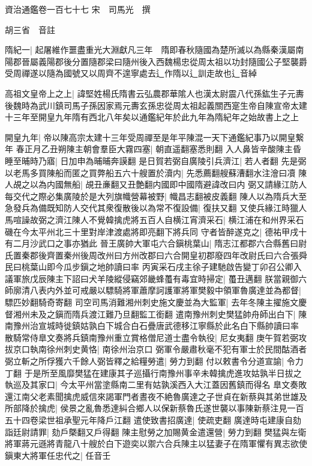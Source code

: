 資治通鑑卷一百七十七
宋　司馬光　撰

胡三省　音註

隋紀一|{
	起屠維作噩盡重光大淵獻凡三年　隋即春秋隨國為楚所滅以為縣秦漢屬南陽郡晉屬義陽郡後分置隨郡梁曰隨州後入西魏楊忠從周太祖以功封隨國公子堅襲爵受周禪遂以隨為國號又以周齊不遑寧處去辶作隋以辶訓走故也辶音綽}


高祖文皇帝上之上|{
	諱堅姓楊氏隋書云弘農郡華隂人也漢太尉震八代孫鈜生子元夀後魏時為武川鎮司馬子孫因家焉元夀玄孫忠從周太祖起義關西寔生帝自陳宣帝太建十三年至開皇九年隋有西北八年矣以通鑑紀年於此九年為隋紀年之始故書上之上}


開皇九年|{
	帝以陳高宗太建十三年受周禪至是年平陳混一天下通鑑紀事乃以開皇繋年}
春正月乙丑朔陳主朝會羣臣大霧四塞|{
	朝直遥翻塞悉則翻}
入人鼻皆辛酸陳主昏睡至晡時乃寤|{
	日加申為晡晡奔謨翻}
是日賀若弼自廣陵引兵濟江|{
	若人者翻}
先是弼以老馬多買陳船而匿之買弊船五六十艘置於瀆内|{
	先悉薦翻艘蘇漕翻水注澮曰凟}
陳人覘之以為内國無船|{
	覘丑亷翻又丑艶翻内國即中國隋避諱改曰内}
弼又請緣江防人每交代之際必集廣陵於是大列旗幟營幕被野|{
	幟昌志翻被皮義翻}
陳人以為隋兵大至急發兵為備既知防人交代其衆復散後以為常不復設備|{
	復扶又翻}
又使兵緣江時獵人馬喧譟故弼之濟江陳人不覺韓擒虎將五百人自横江宵濟采石|{
	横江浦在和州界采石磯在今太平州北三十里對岸津渡處將即亮翻下將兵同}
守者皆醉遂克之|{
	德祐甲戌十有二月沙武口之事亦猶此}
晉王廣帥大軍屯六合鎭桃葉山|{
	隋志江都郡六合縣舊曰尉氏置秦郡後齊置秦州後周改州曰方州改郡曰六合開皇初郡廢四年改尉氏曰六合張舜民曰桃葉山即今瓜步鎭之地帥讀曰率}
丙寅采石戌主徐子建馳啟告變丁卯召公卿入議軍旅戊辰陳主下詔曰犬羊陵縱侵竊郊畿蜂蠆有毒宜時掃定|{
	蠆丑邁翻}
朕當親御六師廓清八表内外並可戒嚴以驃騎將軍蕭摩訶護軍將軍樊毅中領軍魯廣達並為都督|{
	驃匹妙翻騎奇寄翻}
司空司馬消難湘州刺史施文慶並為大監軍|{
	去年冬陳主擢施文慶督湘州未及之鎭而隋兵渡江難乃旦翻監工銜翻}
遣南豫州刺史樊猛帥舟師出白下|{
	陳南豫州治宣城時徙鎮姑孰白下城合白石疊唐武德移江寧縣於此名白下縣帥讀曰率}
散騎常侍臯文奏將兵鎮南豫州重立賞格僧尼道士盡令執役|{
	尼女夷翻}
庚午賀若弼攻拔京口執南徐州刺史黄恪|{
	南徐州治京口}
弼軍令嚴肅秋毫不犯有軍士於民間酤酒者弼立斬之所俘獲六千餘人弼皆釋之給糧勞遣|{
	勞力到翻}
付以敕書令分道宣諭|{
	令力丁翻}
于是所至風靡樊猛在建康其子巡攝行南豫州事辛未韓擒虎進攻姑孰半日拔之執巡及其家口|{
	今太平州當塗縣南二里有姑孰溪西入大江蓋因舊鎮而得名}
臯文奏敗還江南父老素聞擒虎威信來謁軍門者晝夜不絶魯廣達之子世貞在新蔡與其弟世雄及所部降於擒虎|{
	侯景之亂魯悉達糾合鄉人以保新蔡魯氏遂世襲以事陳新蔡注見一百五十四卷梁世祖承聖元年降戶江翻}
遣使致書招廣達|{
	使疏吏翻}
廣達時屯建康自劾詣廷尉請罪|{
	劾戶槩翻又戶得翻}
陳主慰勞之加賜黄金遣還營|{
	勞力到翻}
樊猛與左衛將軍蔣元遜將青龍八十艘於白下遊奕以禦六合兵陳主以猛妻子在隋軍懼有異志欲使鎭東大將軍任忠代之|{
	任音壬}
